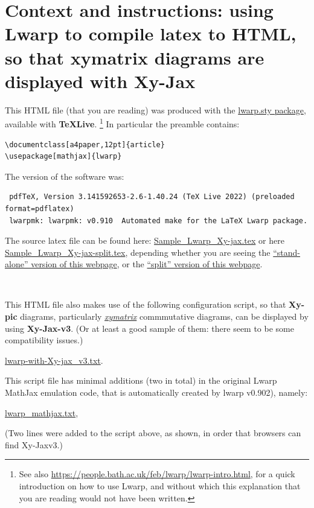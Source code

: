 \documentclass[a4paper,12pt]{article}
\newtheorem{Fundamental Theorem}{Fundamental Theorem}
\begin{document}
\section{Context and instructions: using Lwarp to compile latex to HTML, so that xymatrix diagrams are displayed with Xy-Jax}\label{Context}

\noindent This HTML file (that you are reading) was produced with the
\href{https://ctan.org/pkg/lwarp}{lwarp.sty package}, available with \textbf{TeXLive}.
\medskip
\footnote{See also \url{https://people.bath.ac.uk/feb/lwarp/lwarp-intro.html}, for a quick introduction on how to use Lwarp, and without which this explanation that you are reading would not have been written.}
\medskip
In particular the preamble contains:
\begin{verbatim}
\documentclass[a4paper,12pt]{article}
\usepackage[mathjax]{lwarp}
\end{verbatim}

\medskip
The version of the software was:
\begin{verbatim}
 pdfTeX, Version 3.141592653-2.6-1.40.24 (TeX Live 2022) (preloaded format=pdflatex)
 lwarpmk: lwarpmk: v0.910  Automated make for the LaTeX Lwarp package.
\end{verbatim}

The source latex file can be found here: \href{Sample_Lwarp_Xy-jax.tex}{Sample\_Lwarp\_Xy-jax.tex}  or here \href{Sample_Lwarp_Xy-jax-split.tex}{Sample\_Lwarp\_Xy-jax-split.tex}, depending whether you are seeing the  \href{Sample_Lwarp_Xy-jax.html}{``stand-alone'' version of this webpage}, or the
   \href{Sample_Lwarp_Xy-jax-split-index.html}{``split'' version of this webpage}.


\

 \noindent This HTML file  also makes use of the following configuration script, so that {\textbf{Xy-pic}} diagrams, particularly \href{https://www.ctan.org/pkg/xymatrix}{\textit{xymatrix}} commmutative diagrams, can be displayed by using \textbf{Xy-Jax-v3}. (Or at least a good sample  of them: there seem to be some compatibility issues.)\\
\begin{center}
\href{lwarp-with-Xy-jax_v3.txt}{lwarp-with-Xy-jax\_v3.txt}.
\end{center}
This script file has minimal additions (two in total) in the original Lwarp MathJax emulation code, that is automatically created by  lwarp v0.902), namely:
\begin{center} \href{lwarp_mathjax.txt}{lwarp\_mathjax.txt}, \end{center}
 (Two lines were added to the script above, as shown,  in order that browsers can find Xy-Jaxv3.)
\end{document}
